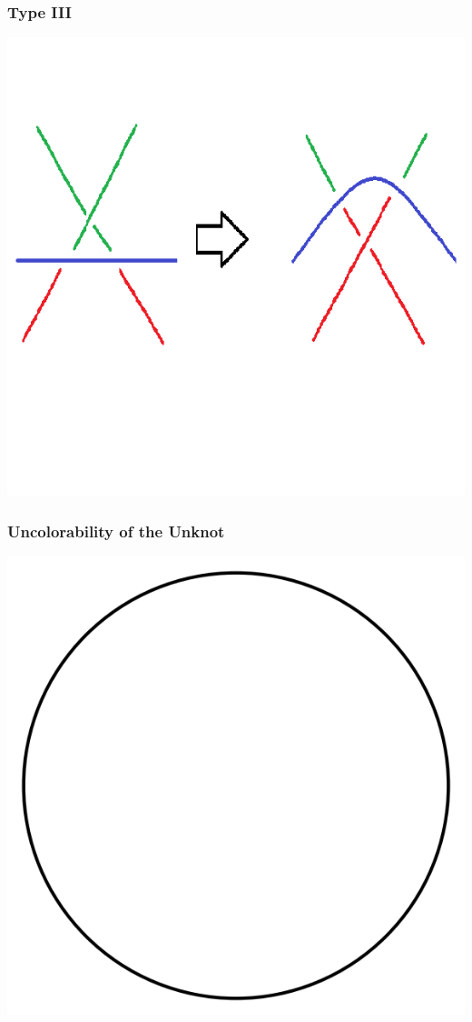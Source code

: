 \documentclass{beamer}
\begin{document}
\begin{frame}
  \frametitle{Type III}
  \begin{center}
    \includegraphics[scale=.6]{t3-c3}
  \end{center}
\end{frame}

\begin{frame}
  \frametitle{Uncolorability of the Unknot}
  \begin{center}
    \includegraphics[scale=.4]{unknot}
  \end{center}
\end{frame}
\end{document}
